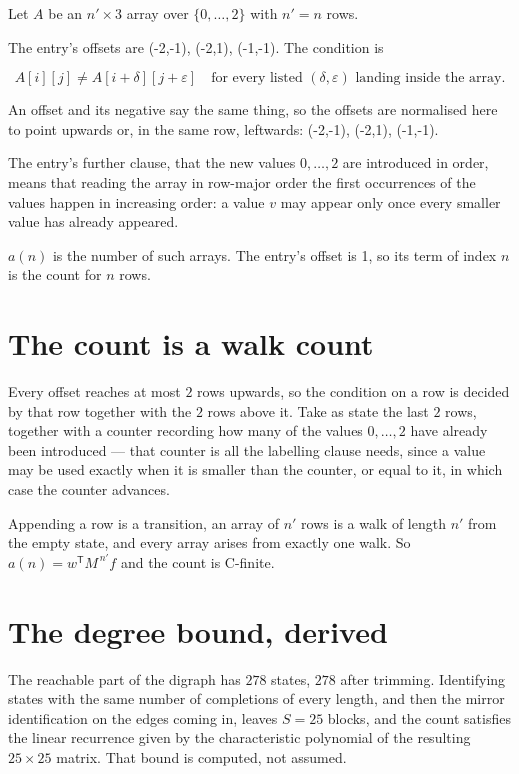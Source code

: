 \documentclass[11pt]{article}
\theoremstyle{definition}
\begin{document}
Let $A$ be an $n' \times 3$ array over $\{0,\dots,2\}$ with $n' = n$ rows.

The entry's offsets are (-2,-1), (-2,1), (-1,-1). The condition is

\[A[i][j] \ne A[i{+}\delta][j{+}\varepsilon]\quad\text{for every listed }(\delta,\varepsilon)\text{ landing inside the array.}\]

An offset and its negative say the same thing, so the offsets are normalised here to point upwards or, in the same row, leftwards: (-2,-1), (-2,1), (-1,-1).

The entry's further clause, that the new values $0,\dots,2$ are introduced in order, means that reading the array in row-major order the first occurrences of the values happen in increasing order: a value $v$ may appear only once every smaller value has already appeared.

$a(n)$ is the number of such arrays. The entry's offset is 1, so its term of index $n$ is the count for $n$ rows.

\section{The count is a walk count}

Every offset reaches at most $2$ rows upwards, so the condition on a row is decided by that row together with the $2$ rows above it. Take as state the last $2$ rows, together with a counter recording how many of the values $0,\dots,2$ have already been introduced --- that counter is all the labelling clause needs, since a value may be used exactly when it is smaller than the counter, or equal to it, in which case the counter advances.

Appending a row is a transition, an array of $n'$ rows is a walk of length $n'$ from the empty state, and every array arises from exactly one walk. So $a(n) = w^{\mathsf T}M^{\,n'}f$ and the count is C-finite.

\section{The degree bound, derived}

The reachable part of the digraph has $278$ states, $278$ after trimming. Identifying states with the same number of completions of every length, and then the mirror identification on the edges coming in, leaves $S = 25$ blocks, and the count satisfies the linear recurrence given by the characteristic polynomial of the resulting $25\times25$ matrix. That bound is computed, not assumed.
\end{document}
